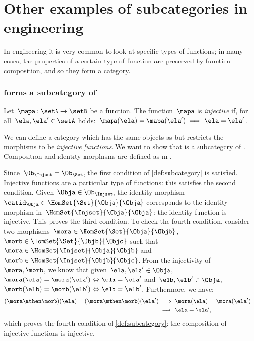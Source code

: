 

\section{Other examples of subcategories in engineering}

In engineering it is very common to look at specific types of functions; in many cases, the properties of a certain type of function are preserved by function composition, and so they form a category.

\subsubsection{\Injset forms a subcategory of \Set}
\begin{definition}
    \label{def:injective-function}
    Let~$\mapa \colon \setA\to \setB$ be a function. The function~$\mapa$ is \emph{injective} if, for all~$\ela,\ela'\in \setA$ holds:~$\mapa(\ela)=\mapa(\ela')\implies \ela=\ela'$.
\end{definition}


\begin{example}
    \label{ex:Injset}
    We can define a category \iindex{\Injset} which has the same objects as \Set but restricts the morphisms to be \emph{injective functions}.
    We want to show that \Injset is a subcategory of \Set. Composition and identity morphisms are defined as in \Set.

    Since~$\Ob_{\Injset}=\Ob_{\Set}$, the first condition of \cref{def:subcategory} is satisfied. Injective functions are a particular type of functions: this satisfies the second condition. Given~$\Obja\in \Ob_{\Injset}$, the identity morphism~$\catid_\Obja\in \HomSet{\Set}{\Obja}{\Obja}$ corresponds to the identity morphism in~$\HomSet{\Injset}{\Obja}{\Obja}$: the identity function is injective. This proves the third condition. To check the fourth condition, consider two morphisms~$\mora \in \HomSet{\Set}{\Obja}{\Objb}$,~$\morb \in \HomSet{\Set}{\Objb}{\Objc}$ such that~$\mora \in \HomSet{\Injset}{\Obja}{\Objb}$ and~$\morb\in \HomSet{\Injset}{\Objb}{\Objc}$. From the injectivity of~$\mora,\morb$, we know that given~$\ela,\ela'\in \Obja$, $\mora(\ela)=\mora(\ela') \Leftrightarrow \ela=\ela'$ and~$\elb,\elb'\in \Obja$,~$\morb(\elb)=\morb(\elb') \Leftrightarrow \elb=\elb'$. Furthermore, we have:
    \begin{equation*}
        \begin{aligned}
        (\mora \mthen \morb)(\ela)
            =(\mora \mthen \morb)(\ela')&\implies \mora(\ela)=\mora(\ela')\\
            &\implies \ela=\ela',
        \end{aligned}
    \end{equation*}
    which proves the fourth condition of \cref{def:subcategory}: the composition of injective functions is injective.
\end{example}


